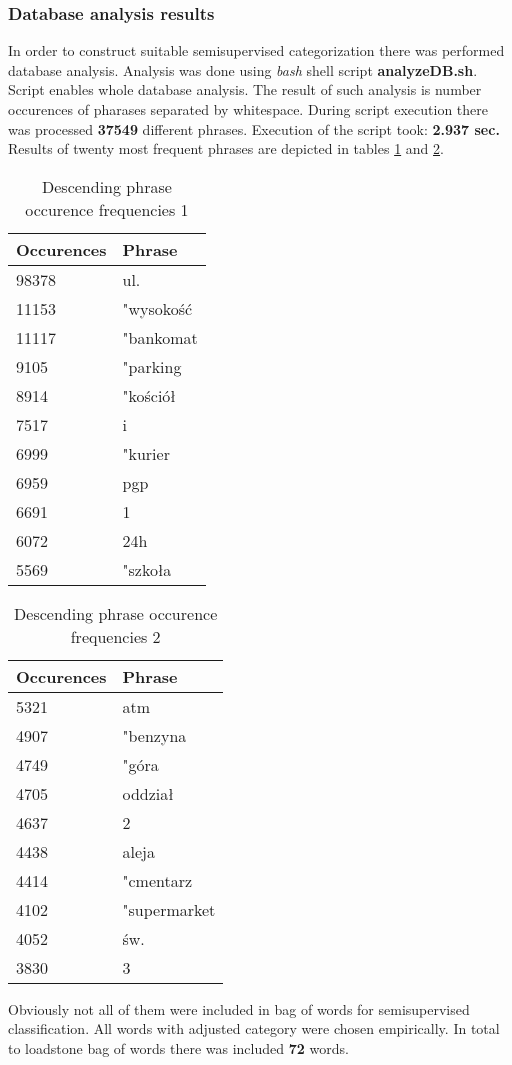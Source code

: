 \subsubsection{Database analysis results}
In order to construct suitable semisupervised categorization there was performed database analysis. Analysis was done using \textit{bash} shell script \textbf{analyzeDB.sh}. Script enables whole database analysis. The result of such analysis is number occurences of pharases separated by whitespace. During script execution there was processed \textbf{37549} different phrases. Execution of the script took: \textbf{2.937 sec.} Results of twenty most frequent phrases are depicted in tables \ref{tab1} and \ref{tab2}.\begin{table}[H]
	\begin{tabular}{ | l | l |}
		\hline
		Occurences & Phrase\tabularnewline \hline
		98378 & ul.	\\
		11153 & "wysokość\\
		11117 & "bankomat\\
		9105  & "parking\\
		8914  & "kościół\\
		7517  & i\\
		6999  & "kurier\\
		6959  & pgp\\
		6691  & 1 \\
		6072  & 24h\\
		5569  & "szkoła\\		
		\hline
	\end{tabular}
	\label{tab1}
	\caption{Descending phrase occurence frequencies 1}
\end{table}
\begin{table}[H]
	\begin{tabular}{ | l | l |}
		\hline
		Occurences & Phrase\\ \hline		
		5321 & atm\\
		4907 & "benzyna\\		
		4749 & "góra\\		
		4705 & oddział\\		
		4637 & 2\\		
		4438 & aleja\\		
		4414 &"cmentarz\\		
		4102 &"supermarket\\	
		4052 & św.\\
		3830 & 3\\		
		\hline
	\end{tabular}
	\label{tab2}
	\caption{Descending phrase occurence frequencies 2}
\end{table}Obviously not all of them were included in bag of words for semisupervised classification. All words with adjusted category were chosen empirically. In total to loadstone bag of words there was included \textbf{72} words.
